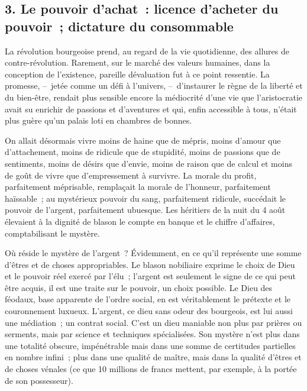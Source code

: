 \documentclass[french,twoside]{book} %
\begin{document}
\subsection[{3. Le pouvoir d’achat : licence d’acheter du pouvoir ; dictature du consommable}]{\textsc{3.} Le pouvoir d’achat : licence d’acheter du pouvoir ; dictature du consommable}
\noindent La révolution bourgeoise prend, au regard de la vie quotidienne, des allures de contre-révolution. Rarement, sur le marché des valeurs humaines, dans la conception de l’existence, pareille dévaluation fut à ce point ressentie. La promesse, – jetée comme un défi à l’univers, – d’instaurer le règne de la liberté et du bien-être, rendait plus sensible encore la médiocrité d’une vie que l’aristocratie avait su enrichir de passions et d’aventures et qui, enfin accessible à tous, n’était plus guère qu’un palais loti en chambres de bonnes.\par
On allait désormais vivre moins de haine que de mépris, moins d’amour que d’attachement, moins de ridicule que de stupidité, moins de passions que de sentiments, moins de désirs que d’envie, moins de raison que de calcul et moins de goût de vivre que d’empressement à survivre. La morale du profit, parfaitement méprisable, remplaçait la morale de l’honneur, parfaitement haïssable ; au mystérieux pouvoir du sang, parfaitement ridicule, succédait le pouvoir de l’argent, parfaitement ubuesque. Les héritiers de la nuit du 4 août élevaient à la dignité de blason le compte en banque et le chiffre d’affaires, comptabilisant le mystère.\par
Où réside le mystère de l’argent ? Évidemment, en ce qu’il représente une somme d’êtres et de choses appropriables. Le blason nobiliaire exprime le choix de Dieu et le pouvoir réel exercé par l’élu ; l’argent est seulement le signe de ce qui peut être acquis, il est une traite sur le pouvoir, un choix possible. Le Dieu des féodaux, base apparente de l’ordre social, en est véritablement le prétexte et le couronnement luxueux. L’argent, ce dieu sans odeur des bourgeois, est lui aussi une médiation ; un contrat social. C’est un dieu maniable non plus par prières ou serments, mais par science et techniques spécialisées. Son mystère n’est plus dans une totalité obscure, impénétrable mais dans une somme de certitudes partielles en nombre infini ; plus dans une qualité de maître, mais dans la qualité d’êtres et de choses vénales (ce que 10 millions de francs mettent, par exemple, à la portée de son possesseur).\par
\end{document}

